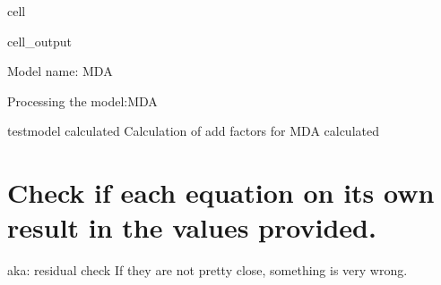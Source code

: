 \documentclass[letterpaper,10pt,english]{jupyterBook}
\begin{document}
\begin{sphinxuseclass}{cell}
\begin{sphinxVerbatimOutput}
\begin{sphinxuseclass}{cell_output}
\begin{sphinxVerbatim}[commandchars=\\\{\}]
Model name: MDA
\end{sphinxVerbatim}

\begin{sphinxVerbatim}[commandchars=\\\{\}]
Processing the model:MDA
\end{sphinxVerbatim}

\begin{sphinxVerbatim}[commandchars=\\\{\}]
testmodel calculated  
Calculation of add factors for MDA calculated  
\end{sphinxVerbatim}

\end{sphinxuseclass}\end{sphinxVerbatimOutput}

\end{sphinxuseclass}

\section{Check if each equation on its own result in the values provided.}
\label{\detokenize{content/howto/onboard/eviews/onboard one model from  wf1:check-if-each-equation-on-its-own-result-in-the-values-provided}}
\sphinxAtStartPar
aka: residual check 
If they are not pretty close, something is very wrong.
\end{document}

